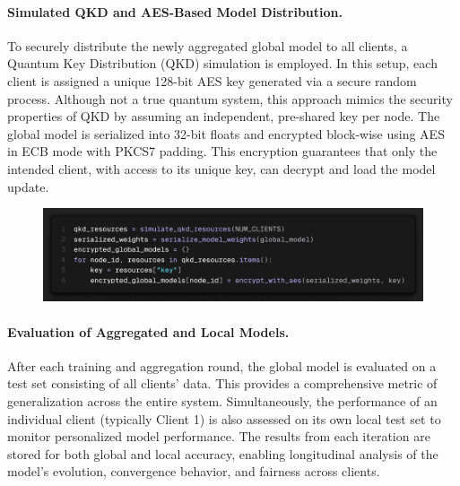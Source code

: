 \documentclass[10pt]{article}
\begin{document}
\paragraph{Simulated QKD and AES-Based Model Distribution.}
To securely distribute the newly aggregated global model to all clients, a Quantum Key Distribution (QKD) simulation is employed. In this setup, each client is assigned a unique 128-bit AES key generated via a secure random process. Although not a true quantum system, this approach mimics the security properties of QKD by assuming an independent, pre-shared key per node.
The global model is serialized into 32-bit floats and encrypted block-wise using AES in ECB mode with PKCS7 padding. This encryption guarantees that only the intended client, with access to its unique key, can decrypt and load the model update.
\begin{figure}[H]
	\centering
	\includegraphics[height = 0.15\textheight]{img/QFL_code/10.png}
\end{figure}

\paragraph{Evaluation of Aggregated and Local Models.}
After each training and aggregation round, the global model is evaluated on a test set consisting of all clients’ data. This provides a comprehensive metric of generalization across the entire system. Simultaneously, the performance of an individual client (typically Client 1) is also assessed on its own local test set to monitor personalized model performance.
The results from each iteration are stored for both global and local accuracy, enabling longitudinal analysis of the model's evolution, convergence behavior, and fairness across clients.
\end{document}

